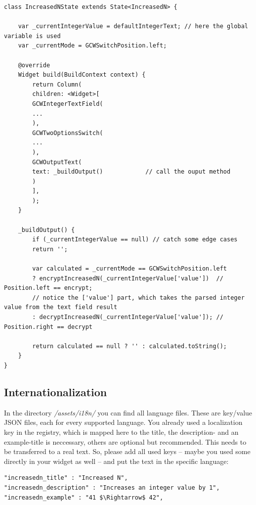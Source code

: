 \begin{lstlisting}
class IncreasedNState extends State<IncreasedN> {
    
    var _currentIntegerValue = defaultIntegerText; // here the global variable is used
    var _currentMode = GCWSwitchPosition.left;
    
    @override
    Widget build(BuildContext context) {
        return Column(
        children: <Widget>[
        GCWIntegerTextField(
        ...
        ),
        GCWTwoOptionsSwitch(
        ...
        ),
        GCWOutputText(
        text: _buildOutput()            // call the ouput method
        )
        ],
        );
    }
    
    _buildOutput() {
        if (_currentIntegerValue == null) // catch some edge cases
        return '';
        
        var calculated = _currentMode == GCWSwitchPosition.left
        ? encryptIncreasedN(_currentIntegerValue['value'])  // Position.left == encrypt; 
        // notice the ['value'] part, which takes the parsed integer value from the text field result
        : decryptIncreasedN(_currentIntegerValue['value']); // Position.right == decrypt
        
        return calculated == null ? '' : calculated.toString();
    }
}
\end{lstlisting}
\label{fig: widgetoutput}


\subsection{Internationalization}
In the directory \emph{/assets/i18n/} you can find all language files. These are key/value JSON files, each for every supported language. You already used a localization key in the registry, which is mapped here to the title, the description- and an example-title is neccessary, others are optional but recommended. This needs to be transferred to a real text. So, please add all used keys -- maybe you used some directly in your widget as well -- and put the text in the specific language:

\begin{lstlisting}
"increasedn_title" : "Increased N",
"increasedn_description" : "Increases an integer value by 1",
"increasedn_example" : "41 $\Rightarrow$ 42",
\end{lstlisting}
\label{fig: json-en}

